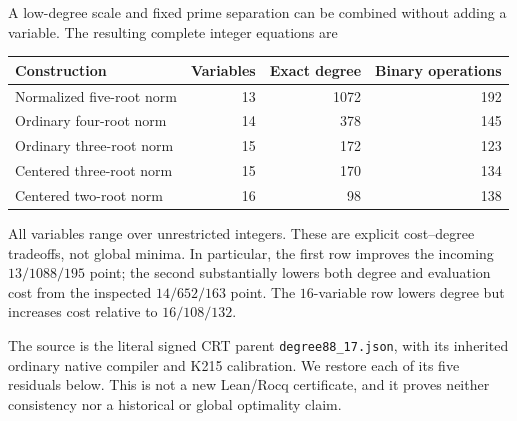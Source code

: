 \documentclass[11pt]{article}
\begin{document}
A low-degree scale and fixed prime separation can be combined without
adding a variable. The resulting complete integer equations are
\begin{center}
\begin{tabular}{lrrr}\toprule
Construction & Variables & Exact degree & Binary operations\\\midrule
Normalized five-root norm &13&1072&192\\
Ordinary four-root norm &14&378&145\\
Ordinary three-root norm &15&172&123\\
Centered three-root norm &15&170&134\\
Centered two-root norm &16&98&138\\\bottomrule
\end{tabular}
\end{center}
All variables range over unrestricted integers. These are explicit
cost--degree tradeoffs, not global minima. In particular, the first row
improves the incoming $13/1088/195$ point; the second substantially lowers
both degree and evaluation cost from the inspected $14/652/163$ point.
The $16$-variable row lowers degree but increases cost relative to
$16/108/132$.

The source is the literal signed CRT parent
\texttt{degree88\_17.json}, with its inherited ordinary native compiler
and K215 calibration. We restore each of its five residuals below.
This is not a new Lean/Rocq certificate, and it proves neither consistency
nor a historical or global optimality claim.
\end{document}

